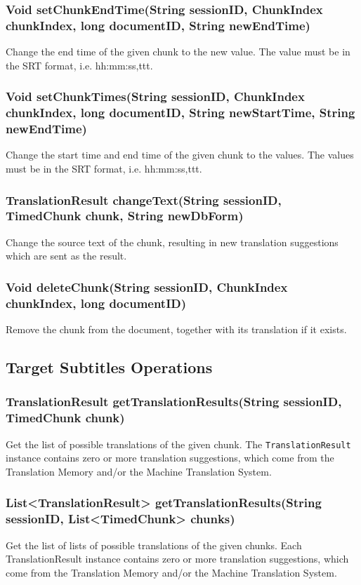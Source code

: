 \subsubsection{Void setChunkEndTime(String sessionID, ChunkIndex chunkIndex, long documentID, String newEndTime)}
Change the end time of the given chunk to the new value. The value must be in the SRT format, i.e. hh:mm:ss,ttt.

\subsubsection{Void setChunkTimes(String sessionID, ChunkIndex chunkIndex, long documentID, String newStartTime, String newEndTime)}
Change the start time and end time of the given chunk to the values. The values must be in the SRT format, i.e. hh:mm:ss,ttt.

\subsubsection{TranslationResult changeText(String sessionID, TimedChunk chunk, String newDbForm)}
Change the source text of the chunk,
resulting in new translation suggestions
which are sent as the result.

\subsubsection{Void deleteChunk(String sessionID, ChunkIndex chunkIndex, long documentID)}
Remove the chunk from the document, together with its translation if it exists.

\subsection{Target Subtitles Operations}

\subsubsection{TranslationResult getTranslationResults(String sessionID, TimedChunk chunk)}
Get the list of possible translations of the given chunk.
The {\tt TranslationResult} instance contains zero or more translation suggestions, which come from the Translation Memory and/or the Machine Translation System.

\subsubsection{List<TranslationResult> getTranslationResults(String sessionID, List<TimedChunk> chunks)}
Get the list of lists of possible translations of the given chunks.
Each TranslationResult instance contains zero or more translation suggestions, which come from the Translation Memory and/or the Machine Translation System.

